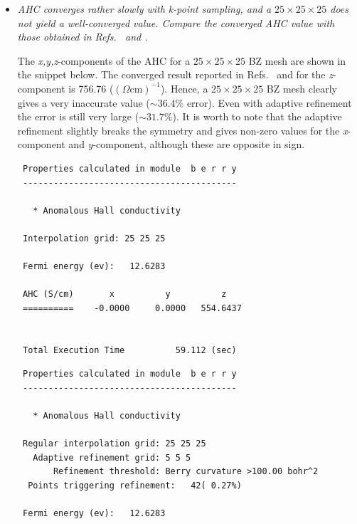 \begin{itemize}
	\item {\it AHC converges rather slowly with k-point sampling, and a $25 \times 25 \times 25$ does not yield a well-converged value.
	Compare the converged AHC value with those obtained in Refs.~ and .}

	The {\it x,y,z}-components of the AHC for a $25\times25\times25$ BZ mesh are shown in the snippet below. The converged result reported in Refs.~ and  for the \textit{z}-component is 756.76 ($(\Omega \mathrm{cm})^{-1}$). Hence, a $25\times25\times25$ BZ mesh clearly gives a very inaccurate value ($\sim 36.4\%$ error). Even with adaptive refinement the error is still very large ($\sim 31.7\%$). It is worth to note that the adaptive refinement slightly breaks the symmetry and gives non-zero values for the \textit{x}-component and \textit{y}-component, although these are opposite in sign.

\begin{tcolorbox}[title=Without adaptive refinement,sharp corners,boxrule=0.5pt]
{\small
\begin{verbatim}
 Properties calculated in module  b e r r y
 ------------------------------------------

   * Anomalous Hall conductivity

 Interpolation grid: 25 25 25

 Fermi energy (ev):   12.6283

 AHC (S/cm)       x          y          z
 ==========    -0.0000     0.0000   554.6437


 Total Execution Time          59.112 (sec)

\end{verbatim}
}
\end{tcolorbox}

\begin{tcolorbox}[title=With adaptive refinement,sharp corners,boxrule=0.5pt]
{\small
\begin{verbatim}
 Properties calculated in module  b e r r y
 ------------------------------------------

   * Anomalous Hall conductivity

 Regular interpolation grid: 25 25 25
   Adaptive refinement grid: 5 5 5
       Refinement threshold: Berry curvature >100.00 bohr^2
  Points triggering refinement:   42( 0.27%)

 Fermi energy (ev):   12.6283


\end{verbatim}}
\end{tcolorbox}
\end{itemize}
